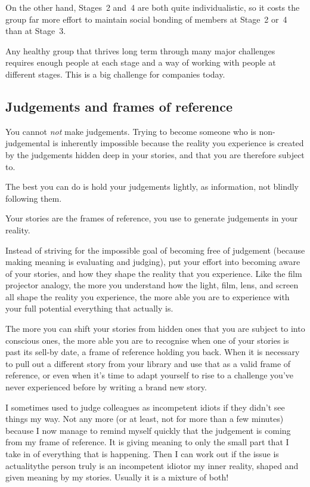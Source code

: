 On the other hand, Stages~2 and~4 are both quite individualistic, so it costs the group far more effort to maintain social bonding of members at Stage~2 or~4 than at Stage~3. 


Any healthy group that thrives long term through many major challenges requires enough people at each stage and a way of working with people at different stages. This is a big challenge for companies today.


\subsection{Judgements and frames of reference} 
You cannot \emph{not} make judgements. Trying to become someone who is non\hyp{}judgemental is inherently impossible because the reality you experience is created by the judgements hidden deep in your stories, and that you are therefore subject to.


The best you can do is hold your judgements lightly, as information, not blindly following them.


Your stories are the frames of reference, you use to generate judgements in your reality. 


Instead of striving for the impossible goal of becoming free of judgement (because making meaning is evaluating and judging), put your effort into becoming aware of your stories, and how they shape the reality that you experience. Like the film projector analogy, the more you understand how the light, film, lens, and screen all shape the reality you experience, the more able you are to experience with your full potential everything that actually is.


The more you can shift your stories from hidden ones that you are subject to into conscious ones, the more able you are to recognise when one of your stories is past its sell-by date, a frame of reference holding you back. When it is necessary to pull out a different story from your library and use that as a valid frame of reference, or even when it's time to adapt yourself to rise to a challenge you've never experienced before by writing a brand new story.


I sometimes used to judge colleagues as incompetent idiots if they didn't see things my way. Not any more (or at least, not for more than a few minutes) because I now manage to remind myself quickly that the judgement is coming from my frame of reference. It is giving meaning to only the small part that I take in of everything that is happening. Then I can work out if the issue is actuality\textemdash the person truly is an incompetent idiot\textemdash or my inner reality, shaped and given meaning by my stories. Usually it is a mixture of both!


